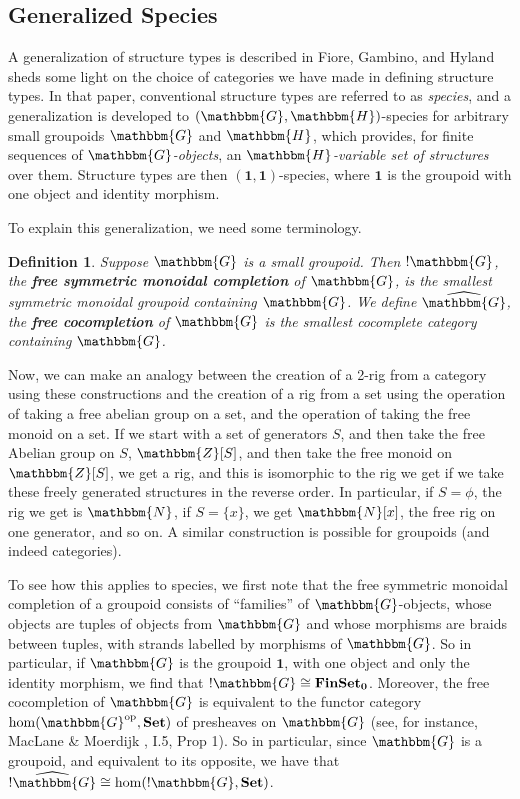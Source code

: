 \documentclass{amsart} \usepackage{amsmath,amssymb,bbm}
\newcommand{\opname}[1]{\operatorname{#1}}
\newtheorem{definition}{Definition}
\newcommand{\bldsym}[1]{\boldsymbol{#1}}
\newcommand{\catname}[1]{\boldsymbol{\opname{{#1}}}}
\newcommand{\FSN}{\catname{FinSet_0}}
\newcommand{\Set}{\catname{Set}}
\begin{document}
\subsection{Generalized Species} \label{generalspecies}

A generalization of structure types is described in Fiore, Gambino,
and Hyland {\cite{figamhy}} sheds some light on the choice of categories we have made in
defining structure types.  In that paper, conventional structure types are
referred to as {\textit{species}}, and a generalization is developed to $(
\mathbbm{G}, \mathbbm{H} )$-species for arbitrary small groupoids
$\mathbbm{G}$ and $\mathbbm{H}$, which provides, for finite sequences of
{\textit{$\mathbbm{G}$-objects}}, an {\textit{$\mathbbm{H}$-variable set of
structures}} over them.  Structure types are then
$(\bldsym{1},\bldsym{1})$-species, where $\bldsym{1}$ is the groupoid
with one object and identity morphism.

To explain this generalization, we need some terminology.

\begin{definition}
  Suppose $\mathbbm{G}$ is a small groupoid.  Then $! \mathbbm{G}$, the
  {\textbf{free symmetric monoidal completion}} of $\mathbbm{G}$, is the
  smallest symmetric monoidal groupoid containing $\mathbbm{G}$.  We define
  $\widehat{\mathbbm{G}}$, the {\textbf{free cocompletion}} of $\mathbbm{G}$
  is the smallest cocomplete category containing $\mathbbm{G}$.
\end{definition}

Now, we can make an analogy between the creation of a 2-rig from a category
using these constructions and the creation of a rig from a set using the
operation of taking a free abelian group on a set, and the operation of taking
the free monoid on a set.  If we start with a set of generators $S$, and then
take the free Abelian group on $S$, $\mathbbm{Z}[S]$, and then take the
free monoid on $\mathbbm{Z}[S]$, we get a rig, and this is isomorphic to
the rig we get if we take these freely generated structures in the reverse
order.  In particular, if $S = \phi$, the rig we get is $\mathbbm{N}$, if $S =
\{x\}$, we get $\mathbbm{N}[x]$, the free rig on one generator, and so
on.  A similar construction is possible for groupoids (and indeed categories).

To see how this applies to species, we first note that the free symmetric
monoidal completion of a groupoid consists of ``families'' of
$\mathbbm{G}$-objects, whose objects are tuples of objects from $\mathbbm{G}$
and whose morphisms are braids between tuples, with strands labelled by
morphisms of $\mathbbm{G}$.  So in particular, if $\mathbbm{G}$ is the
groupoid $\bldsym{1}$, with one object and only the identity morphism, we
find that $! \mathbbm{G} \cong \FSN$. Moreover, the free
cocompletion of $\mathbbm{G}$ is equivalent to the functor category $\hom (
\mathbbm{G}^{\opname{op}}, \Set )$ of presheaves on
$\mathbbm{G}$ (see, for instance, MacLane \& Moerdijk
{\cite{macmoer}}, I.5, Prop 1).  So in particular, since $\mathbbm{G}$
is a groupoid, and equivalent to its opposite, we have that
$\widehat{! \mathbbm{G}} \cong \hom ( !
\mathbbm{G}, \Set )$.
\end{document}
